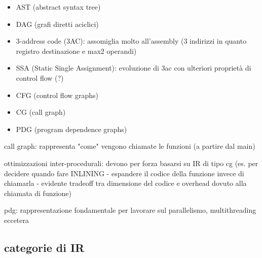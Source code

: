 \begin{itemize}
  \item AST (abstract syntax tree)
  \item DAG (grafi diretti aciclici)
  \item 3-address code (3AC): assomiglia molto all'assembly (3 indirizzi in quanto registro destinazione e max2 operandi)
  \item SSA (Static Single Assignment): evoluzione di 3ac con ulteriori propriet\`a di control flow (?)
  \item CFG (control flow graphs)
  \item CG (call graph)
  \item PDG (program dependence graphs)
\end{itemize}

call graph: rappresenta "come" vengono chiamate le funzioni (a partire dal main)

ottimizzazioni inter-procedurali: devono per forza basarsi su IR di tipo cg (es. per decidere quando fare INLINING - espandere il codice della funzione invece di chiamarla - evidente tradeoff tra dimensione del codice e overhead dovuto alla chiamata di funzione)

pdg: rappresentazione fondamentale per lavorare sul parallelismo, multithreading eccetera

\subsection{categorie di IR}

